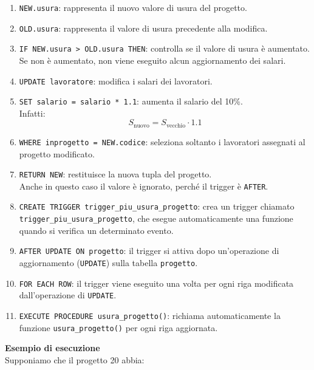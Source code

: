 \begin{enumerate}
    \item \texttt{NEW.usura}: rappresenta
    il nuovo valore di usura del progetto.

    \item \texttt{OLD.usura}: rappresenta
    il valore di usura precedente alla modifica.

    \item \texttt{IF NEW.usura > OLD.usura THEN}: controlla
    se il valore di usura è aumentato.\\
    Se non è aumentato, non viene eseguito
    alcun aggiornamento dei salari.

    \item \texttt{UPDATE lavoratore}: modifica
    i salari dei lavoratori.

    \item \texttt{SET salario = salario * 1.1}:
    aumenta il salario del 10\%.\\
    Infatti:
    \[
    S_{\text{nuovo}} =
    S_{\text{vecchio}}\cdot 1.1
    \]

    \item \texttt{WHERE inprogetto = NEW.codice}:
    seleziona soltanto i lavoratori
    assegnati al progetto modificato.

    \item \texttt{RETURN NEW}: restituisce
    la nuova tupla del progetto.\\
    Anche in questo caso il valore è ignorato,
    perché il trigger è \texttt{AFTER}.

    \item \texttt{CREATE TRIGGER trigger\_piu\_usura\_progetto}: crea un trigger chiamato \texttt{trigger\_piu\_usura\_progetto}, che esegue automaticamente una funzione quando si verifica un determinato evento.
    
    \item \texttt{AFTER UPDATE ON progetto}: il trigger si attiva dopo un'operazione di aggiornamento (\texttt{UPDATE}) sulla tabella \texttt{progetto}.

    \item \texttt{FOR EACH ROW}: il trigger viene eseguito una volta per ogni riga modificata dall'operazione di \texttt{UPDATE}.

    \item \texttt{EXECUTE PROCEDURE usura\_progetto()}: richiama automaticamente la funzione \texttt{usura\_progetto()} per ogni riga aggiornata.

\end{enumerate}
\noindent
\textbf{Esempio di esecuzione}\\
Supponiamo che il progetto 20 abbia:

